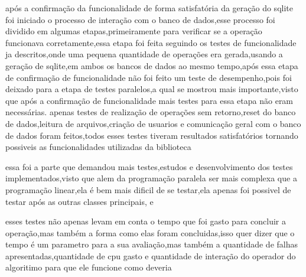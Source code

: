 \documentclass[
	12pt,				%
	openright,			%
	oneside,			%
	a4paper,			%
	english,			%
	french,				%
	spanish,			%
	brazil,				%
	]{abntex2}
\begin{document}
após a confirmação da funcionalidade de forma satisfatória da geração do sqlite foi iniciado o processo de interação com o banco de dados,esse processo foi dividido em algumas etapas,primeiramente para verificar se a operação funcionava corretamente,essa etapa foi feita seguindo os testes de funcionalidade ja descritos,onde uma pequena quantidade de operações era gerada,usando a geração de sqlite,em ambos os bancos de dados ao mesmo tempo,após essa etapa de confirmação de funcionalidade não foi feito um teste de desempenho,pois foi deixado para a etapa de testes paralelos,a qual se mostrou mais importante,visto que após a confirmação de funcionalidade mais testes para essa etapa não eram necessárias.
apenas testes de realização de operações sem retorno,reset do banco de dados,leitura de arquivos,criação de usuarios e comunicação geral com o banco de dados foram feitos,todos esses testes tiveram resultados satisfatórios tornando possiveis as funcionalidades utilizadas da biblioteca 

essa foi a parte que demandou mais testes,estudos e desenvolvimento dos testes implementados,visto que alem da programação paralela ser mais complexa que a programação linear,ela é bem mais dificil de se testar,ela apenas foi possivel de testar após as outras classes principais, e 

esses testes não apenas levam em conta o tempo que foi gasto para concluir a operação,mas também a forma como elas foram concluidas,isso quer dizer que o tempo é um parametro para a sua avaliação,mas também a quantidade de falhas apresentadas,quantidade de cpu gasto e quantidade de interação do operador do algoritimo para que ele funcione como deveria
\end{document}
